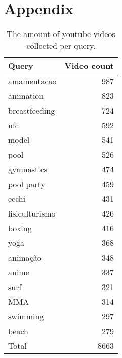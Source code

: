 \section{Appendix}\label{sec:appendix}

\begin{table}
\centering
\caption{The amount of youtube videos collected per query.}
\label{tab:non-yt-count}
\begin{tabular}{|l|r|} 
\hline
Query  & \multicolumn{1}{l|}{Video count}  \\ 
\hline
amamentacao    & 987                               \\ 
\hline
animation      & 823                               \\ 
\hline
breastfeeding  & 724                               \\ 
\hline
ufc            & 592                               \\ 
\hline
model          & 541                               \\ 
\hline
pool           & 526                               \\ 
\hline
gymnastics     & 474                               \\ 
\hline
pool party     & 459                               \\ 
\hline
ecchi          & 431                               \\ 
\hline
fisiculturismo & 426                               \\ 
\hline
boxing         & 416                               \\ 
\hline
yoga           & 368                               \\ 
\hline
animação       & 348                               \\ 
\hline
anime          & 337                               \\ 
\hline
surf           & 321                               \\ 
\hline
MMA            & 314                               \\ 
\hline
swimming       & 297                               \\ 
\hline
beach          & 279                               \\ 
\hline
Total          & 8663                              \\
\hline
\end{tabular}
\end{table}